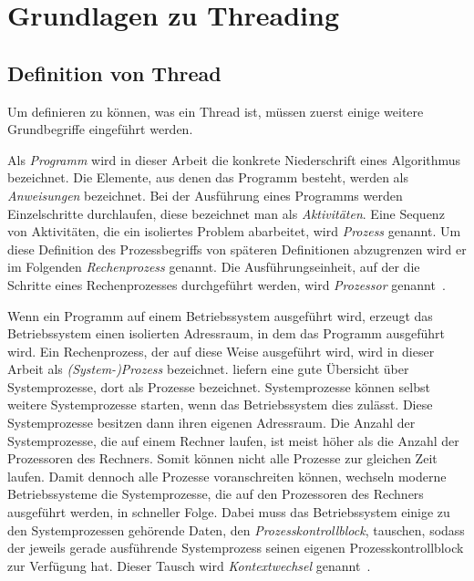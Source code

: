 \section{Grundlagen zu Threading}


\subsection{Definition von Thread}
Um definieren zu können, was ein Thread ist, müssen zuerst einige weitere Grundbegriffe eingeführt werden. 

Als \emph{Programm} wird in dieser Arbeit die konkrete Niederschrift eines Algorithmus bezeichnet. Die Elemente, aus denen das Programm besteht, werden als \emph{Anweisungen} bezeichnet. Bei der Ausführung eines Programms werden Einzelschritte durchlaufen, diese bezeichnet man als \emph{Aktivitäten}. Eine Sequenz von Aktivitäten, die ein isoliertes Problem abarbeitet, wird \emph{Prozess} genannt. Um diese Definition des Prozessbegriffs von späteren Definitionen abzugrenzen wird er im Folgenden \emph{Rechenprozess} genannt. Die Ausführungseinheit, auf der die Schritte eines Rechenprozesses durchgeführt werden, wird \emph{Prozessor} genannt~\cite[S.~22]{Herrtwich1989}.

Wenn ein Programm auf einem Betriebssystem ausgeführt wird, erzeugt das Betriebssystem einen isolierten Adressraum, in dem das Programm ausgeführt wird. Ein Rechenprozess, der auf diese Weise ausgeführt wird, wird in dieser Arbeit als \emph{(System-)Prozess} bezeichnet. \textcite[Kapitel~2]{Tanenbaum2016} liefern eine gute Übersicht über Systemprozesse, dort als Prozesse bezeichnet. Systemprozesse können selbst weitere Systemprozesse starten, wenn das Betriebssystem dies zulässt. Diese Systemprozesse besitzen dann ihren eigenen Adressraum. Die Anzahl der Systemprozesse, die auf einem Rechner laufen, ist meist höher als die Anzahl der Prozessoren des Rechners. Somit können nicht alle Prozesse zur gleichen Zeit laufen. Damit dennoch alle Prozesse voranschreiten können, wechseln moderne Betriebssysteme die Systemprozesse, die auf den Prozessoren des Rechners ausgeführt werden, in schneller Folge. Dabei muss das Betriebssystem einige zu den Systemprozessen gehörende Daten, den \emph{Prozesskontrollblock}, tauschen, sodass der jeweils gerade ausführende Systemprozess seinen eigenen Prozesskontrollblock zur Verfügung hat. Dieser Tausch wird \emph{Kontextwechsel} genannt~\cite[S.~59]{Tanenbaum2016}.

